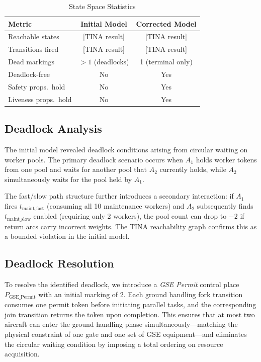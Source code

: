 \documentclass[conference,a4paper]{IEEEtran}
\begin{document}
\begin{table}[htbp]
\caption{State Space Statistics}
\label{tab:ss}
\centering
\begin{tabular}{@{}lcc@{}}
\toprule
\textbf{Metric} & \textbf{Initial Model} & \textbf{Corrected Model} \\
\midrule
Reachable states      & {[}TINA result{]} & {[}TINA result{]} \\
Transitions fired     & {[}TINA result{]} & {[}TINA result{]} \\
Dead markings         & $>1$ (deadlocks)  & 1 (terminal only) \\
Deadlock-free         & No                & Yes               \\
Safety props.\ hold   & No                & Yes               \\
Liveness props.\ hold & No                & Yes               \\
\bottomrule
\end{tabular}
\end{table}

\subsection{Deadlock Analysis}

The initial model revealed deadlock conditions arising from circular waiting
on worker pools. The primary deadlock scenario occurs when $A_1$ holds worker
tokens from one pool and waits for another pool that $A_2$ currently holds,
while $A_2$ simultaneously waits for the pool held by $A_1$.

The fast/slow path structure further introduces a secondary interaction: if
$A_1$ fires $t_{\mathrm{maint\_fast}}$ (consuming all 10 maintenance workers)
and $A_2$ subsequently finds $t_{\mathrm{maint\_slow}}$ enabled (requiring
only 2 workers), the pool count can drop to $-2$ if return arcs carry
incorrect weights. The TINA reachability graph confirms this as a bounded
violation in the initial model.

\subsection{Deadlock Resolution}

To resolve the identified deadlock, we introduce a \emph{GSE Permit} control
place $P_{\mathrm{GSE\_Permit}}$ with an initial marking of 2. Each ground
handling fork transition consumes one permit token before initiating parallel
tasks, and the corresponding join transition returns the token upon
completion. This ensures that at most two aircraft can enter the ground
handling phase simultaneously---matching the physical constraint of one gate
and one set of GSE equipment---and eliminates the circular waiting condition
by imposing a total ordering on resource acquisition.
\end{document}
